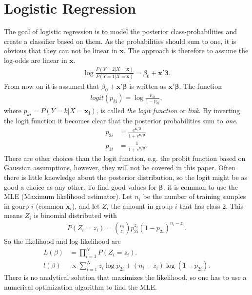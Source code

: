 \section{Logistic Regression}
\label{sec:Logistic Regression}
The goal of logistic regression is to model the posterior class-probabilities and create a classifier based on them. As the probabilities should sum to one, it is obvious that they can not be linear in $\mathbf{x}$. The approach is therefore to assume the log-odds are linear in $\mathbf{x}$. 
\begin{align}
  \label{eq:logclass} 
   \log \frac{P(Y=2|X=\mathbf{x})}{P(Y=1|X=\mathbf{x})} = \beta_0 + \mathbf{x}'\bm \beta.
\end{align}
From now on it is assumed that $\beta_0 + \mathbf{x}' \bm \beta$ is written as $\mathbf{x}' \bm \beta$.
The function
\begin{align}
  logit(p_{ki}) = \log  \frac{p_{ki}}{1-p_{ki}},
\end{align}
where $p_{ki} = P(Y=k|X=\mathbf{x_i})$, is called \textit{the logit function} or \textit{link}. By inverting the logit function it becomes clear that the posterior probabilities sum to \textit{one}.
\begin{align}
  p_{2i} &=  \frac{e^{\mathbf{x}_i'\bm \beta}}{1 + e^{\mathbf{x}_i'\bm \beta}} \\
  p_{1i} &=  \frac{1}{1 + e^{\mathbf{x}_i'\bm \beta}}.
\end{align}
There are other choices than the logit function, e.g. the probit function based on Gaussian assumptions, however, they will not be covered in this paper. 
Often there is little knowledge about the posterior distribution, so the logit might be as good a choice as any other. 
To find good values for $\bm \beta$, it is common to use the MLE (Maximum likelihood estimator). Let $n_i$ be the number of training samples in gourp $i$ (common $\mathbf{x}_i$), and let $Z_i$ the amount in group $i$ that has class $2$. This means $Z_i$ is binomial distributed with
\begin{align}
  P(Z_i = z_i) = \binom{n_i}{z_i} p_{2i}^{z_i} (1-p_{2i})^{n_i - z_i}.
\end{align}
So the likelihood and log-likelihood are
\begin{align}
  L(\beta) &= \prod_{i = 1}^{N} P(Z_i = z_i). \\
  l(\beta) &\propto \sum^{N}_{i=1} z_i \log p_{2i} + (n_i - z_i) \log (1- p_{2i}).
\end{align}
There is no analytical solution that maximizes the likelihood, so one has to use a numerical optimization algorithm to find the MLE.  
